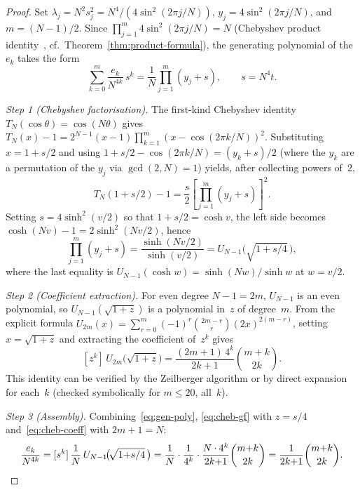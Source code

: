 \documentclass[aip,jmp,reprint,superscriptaddress,floatfix,nofootinbib]{revtex4-2}
\theoremstyle{definition}
\theoremstyle{remark}
\begin{document}
\begin{proof}
Set $\lambda_j = N^2 s_j^2 = N^4/(4\sin^2(2\pi j/N))$,
$y_j = 4\sin^2(2\pi j/N)$, and $m = (N{-}1)/2$.
Since $\prod_{j=1}^{m}4\sin^2(2\pi j/N) = N$
(Chebyshev product identity~\cite{chebyshev}, cf.\
Theorem~\ref{thm:product-formula}), the generating polynomial
of the $e_k$ takes the form
\begin{equation}\label{eq:gen-poly}
  \sum_{k=0}^{m}\frac{e_k}{N^{4k}}\,s^k
  = \frac{1}{N}\prod_{j=1}^{m}(y_j + s),
  \qquad s = N^4 t.
\end{equation}

\emph{Step 1 (Chebyshev factorisation).}
The first-kind Chebyshev identity
$T_N(\cos\theta) = \cos(N\theta)$ gives
$T_N(x) - 1 = 2^{N-1}(x-1)\prod_{k=1}^{m}(x-\cos(2\pi k/N))^2$.
Substituting $x = 1 + s/2$ and using
$1{+}s/2 - \cos(2\pi k/N) = (y_k + s)/2$
(where the $y_k$ are a permutation of the $y_j$ via
$\gcd(2,N)=1$) yields, after collecting powers of~$2$,
\[
  T_N(1{+}s/2) - 1
  = \frac{s}{2}\left[\prod_{j=1}^{m}(y_j + s)\right]^{\!2}.
\]
Setting $s = 4\sinh^2(v/2)$ so that $1{+}s/2 = \cosh v$, the
left side becomes $\cosh(Nv)-1 = 2\sinh^2(Nv/2)$, hence
\begin{equation}\label{eq:cheb-gf}
  \prod_{j=1}^{m}(y_j + s)
  = \frac{\sinh(Nv/2)}{\sinh(v/2)}
  = U_{N-1}\!\bigl(\!\sqrt{1{+}s/4}\,\bigr),
\end{equation}
where the last equality is
$U_{N-1}(\cosh w) = \sinh(Nw)/\sinh w$ at $w = v/2$.

\emph{Step 2 (Coefficient extraction).}
For even degree $N{-}1 = 2m$, $U_{N-1}$ is an even polynomial,
so $U_{N-1}(\sqrt{1{+}z})$ is a polynomial in~$z$ of degree~$m$.
From the explicit formula
$U_{2m}(x) = \sum_{r=0}^{m}(-1)^r\binom{2m{-}r}{r}(2x)^{2(m-r)}$,
setting $x = \sqrt{1{+}z}$ and extracting the coefficient of~$z^k$
gives
\begin{equation}\label{eq:cheb-coeff}
  [z^k]\,U_{2m}\!\bigl(\sqrt{1{+}z}\bigr)
  = \frac{(2m{+}1)\,4^k}{2k{+}1}\binom{m{+}k}{2k}.
\end{equation}
This identity can be verified by the Zeilberger algorithm or
by direct expansion for each~$k$ (checked symbolically for
$m \le 20$, all~$k$).

\emph{Step 3 (Assembly).}
Combining~\eqref{eq:gen-poly}, \eqref{eq:cheb-gf} with
$z = s/4$ and~\eqref{eq:cheb-coeff} with $2m{+}1 = N$:
\[
  \frac{e_k}{N^{4k}} = [s^k]\,\frac{1}{N}\,U_{N-1}\!\bigl(\!\sqrt{1{+}s/4}\,\bigr)
  = \frac{1}{N}\cdot\frac{1}{4^k}\cdot\frac{N\cdot 4^k}{2k{+}1}\binom{m{+}k}{2k}
  = \frac{1}{2k{+}1}\binom{m{+}k}{2k}.\qedhere
\]
\end{proof}
\end{document}
